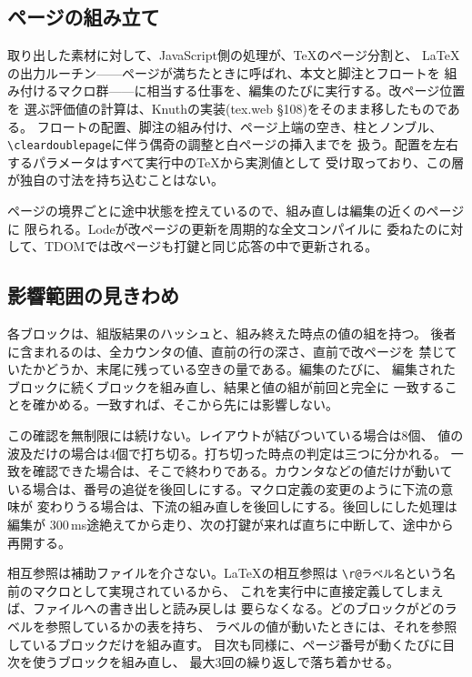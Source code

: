 \documentclass[a4paper,11pt]{ltjsarticle}
\newcommand{\tdom}{TDOM}
\newcommand{\code}[1]{\texttt{#1}}
\begin{document}
\subsection{ページの組み立て}

取り出した素材に対して、JavaScript側の処理が、\TeX{}のページ分割と、
\LaTeX{}の出力ルーチン——ページが満ちたときに呼ばれ、本文と脚注とフロートを
組み付けるマクロ群——に相当する仕事を、編集のたびに実行する。改ページ位置を
選ぶ評価値の計算は、Knuthの実装(tex.web \S108)をそのまま移したものである。
フロートの配置、脚注の組み付け、ページ上端の空き、柱とノンブル、
\code{\textbackslash cleardoublepage}に伴う偶奇の調整と白ページの挿入までを
扱う。配置を左右するパラメータはすべて実行中の\TeX{}から実測値として
受け取っており、この層が独自の寸法を持ち込むことはない。

ページの境界ごとに途中状態を控えているので、組み直しは編集の近くのページに
限られる。Lode\cite{lode2026}が改ページの更新を周期的な全文コンパイルに
委ねたのに対して、\tdom{}では改ページも打鍵と同じ応答の中で更新される。

\subsection{影響範囲の見きわめ}

各ブロックは、組版結果のハッシュと、組み終えた時点の値の組を持つ。
後者に含まれるのは、全カウンタの値、直前の行の深さ、直前で改ページを
禁じていたかどうか、末尾に残っている空きの量である。編集のたびに、
編集されたブロックに続くブロックを組み直し、結果と値の組が前回と完全に
一致することを確かめる。一致すれば、そこから先には影響しない。

この確認を無制限には続けない。レイアウトが結びついている場合は8個、
値の波及だけの場合は4個で打ち切る。打ち切った時点の判定は三つに分かれる。
一致を確認できた場合は、そこで終わりである。カウンタなどの値だけが動いて
いる場合は、番号の追従を後回しにする。マクロ定義の変更のように下流の意味が
変わりうる場合は、下流の組み直しを後回しにする。後回しにした処理は編集が
300\,ms途絶えてから走り、次の打鍵が来れば直ちに中断して、途中から再開する。

相互参照は補助ファイルを介さない。\LaTeX{}の相互参照は
\code{\textbackslash r@ラベル名}という名前のマクロとして実現されているから、
これを実行中に直接定義してしまえば、ファイルへの書き出しと読み戻しは
要らなくなる。どのブロックがどのラベルを参照しているかの表を持ち、
ラベルの値が動いたときには、それを参照しているブロックだけを組み直す。
目次も同様に、ページ番号が動くたびに目次を使うブロックを組み直し、
最大3回の繰り返しで落ち着かせる。
\end{document}
